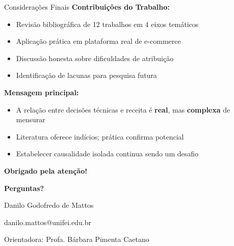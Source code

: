 \documentclass{beamer}
\begin{document}
    \begin{frame}{Considerações Finais}
        \textbf{Contribuições do Trabalho:}
        \begin{itemize}
            \item Revisão bibliográfica de 12 trabalhos em 4 eixos temáticos
            \item Aplicação prática em plataforma real de e-commerce
            \item Discussão honesta sobre dificuldades de atribuição
            \item Identificação de lacunas para pesquisa futura
        \end{itemize}

        \vspace{0.4cm}

        \textbf{Mensagem principal:}
        \begin{itemize}
            \item A relação entre decisões técnicas e receita é \textbf{real}, mas \textbf{complexa} de mensurar
            \item Literatura oferece indícios; prática confirma potencial
            \item Estabelecer causalidade isolada continua sendo um desafio
        \end{itemize}

        \vspace{0.4cm}

        \centering
        \textbf{Obrigado pela atenção!}
    \end{frame}

    \begin{frame}
        \centering
        \vspace{2cm}
        {\Huge \textbf{Perguntas?}}

        \vspace{1cm}

        {\large Danilo Godofredo de Mattos}

        \vspace{0.3cm}

        {\small danilo.mattos@unifei.edu.br}

        \vspace{0.3cm}

        {\small Orientadora: Profa. Bárbara Pimenta Caetano}
    \end{frame}
\end{document}
